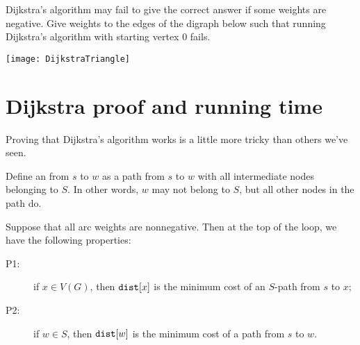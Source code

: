 \begin{Boxample}[0.5] \label{ex:dijk-neg-fails}
Dijkstra's algorithm may fail to give the correct answer if some weights are negative.
Give weights to the edges of the digraph below such that running Dijkstra's algorithm with starting vertex $0$
fails. 
\vspace{0.5cm} 
\begin{center}
\texttt{[image: DijkstraTriangle]}
\end{center}
\end{Boxample}

\chapter{Dijkstra proof and running time} %

Proving that Dijkstra's algorithm works is a little more tricky than others we've seen.

Define an  from $s$ to $w$ as a
path from $s$ to $w$ with all intermediate nodes belonging to $S$. In other words, $w$ may not belong to $S$, but all other nodes in the path do.

\begin{Theorem}
\label{thm:dijkstra} Suppose that all arc weights are nonnegative. Then
at the top of the  loop, we have the following properties:
\begin{description}
\item[P1:] if $x\in V(G)$, then $\dist[x]$ is the minimum cost of an $S$-path 
from $s$ to $x$;
\item[P2:] if $w\in S$, then $\dist[w]$ is the minimum cost of a path
from $s$ to $w$.
\end{description}
\end{Theorem}

